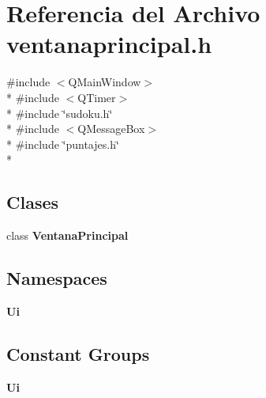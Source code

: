 \section{Referencia del Archivo ventanaprincipal.\-h}
\label{ventanaprincipal_8h}
{\ttfamily \#include $<$Q\-Main\-Window$>$}\\*
{\ttfamily \#include $<$Q\-Timer$>$}\\*
{\ttfamily \#include \char`\"{}sudoku.\-h\char`\"{}}\\*
{\ttfamily \#include $<$Q\-Message\-Box$>$}\\*
{\ttfamily \#include \char`\"{}puntajes.\-h\char`\"{}}\\*
\subsection*{Clases}
\begin{DoxyCompactItemize}
\item 
class {\bf Ventana\-Principal}
\end{DoxyCompactItemize}
\subsection*{Namespaces}
\begin{DoxyCompactItemize}
\item 
{\bf Ui}
\end{DoxyCompactItemize}
\subsection*{Constant Groups}
\begin{DoxyCompactItemize}
\item 
{\bf Ui}
\end{DoxyCompactItemize}
